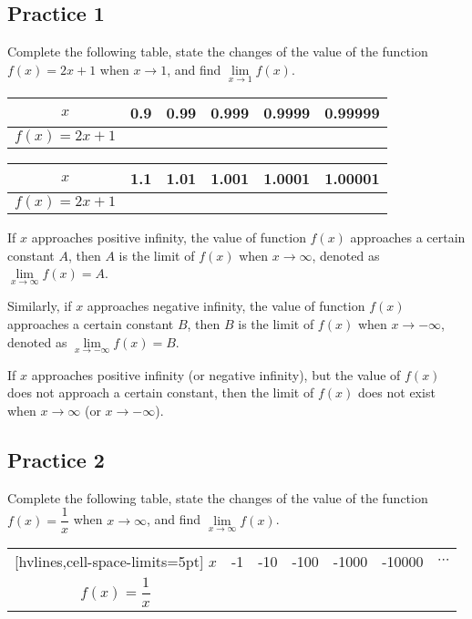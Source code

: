 \documentclass[12pt]{report}
\begin{document}
\subsection*{Practice 1}

Complete the following table, state the changes of the value of the function
$f(x) = 2x + 1$ when $x \to 1$, and find $\lim\limits_{x \to 1} f(x)$.

\begin{center}
  \begin{tabular}{|c|c|c|c|c|c|}
    \hline
    $x$             & 0.9 & 0.99 & 0.999 & 0.9999 & 0.99999 \\
    \hline
    $f(x) = 2x + 1$ &     &      &       &        &         \\
    \hline
  \end{tabular}
\end{center}
\begin{center}
  \begin{tabular}{|c|c|c|c|c|c|}
    \hline
    $x$             & 1.1 & 1.01 & 1.001 & 1.0001 & 1.00001 \\
    \hline
    $f(x) = 2x + 1$ &     &      &       &        &         \\
    \hline
  \end{tabular}
\end{center}

If $x$ approaches positive infinity, the value of function $f(x)$ approaches a
certain constant $A$, then $A$ is the limit of $f(x)$ when $x \to \infty$,
denoted as $\lim\limits_{x \to \infty} f(x) = A$.

Similarly, if $x$ approaches negative infinity, the value of function $f(x)$
approaches a certain constant $B$, then $B$ is the limit of $f(x)$ when $x \to
  -\infty$, denoted as $\lim\limits_{x \to -\infty} f(x) = B$.

If $x$ approaches positive infinity (or negative infinity), but the value of
$f(x)$ does not approach a certain constant, then the limit of $f(x)$ does not
exist when $x \to \infty$ (or $x \to -\infty$).

\subsection*{Practice 2}

Complete the following table, state the changes of the value of the function
$f(x) = \dfrac{1}{x}$ when $x \to \infty$, and find $\lim\limits_{x \to \infty}
  f(x)$.

\begin{center}
  \begin{NiceTabular}{|c|c|c|c|c|c|c|}[hvlines,cell-space-limits=5pt]
    $x$                   & -1 & -10 & -100 & -1000 & -10000 & $\cdots$ \\
    $f(x) = \dfrac{1}{x}$ &    &     &      &       &        &          \\
  \end{NiceTabular}
\end{center}
\end{document}
